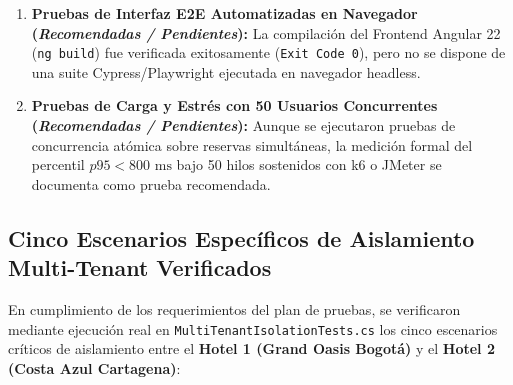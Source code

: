 \documentclass[12pt,a4paper]{article}
\begin{document}
\begin{enumerate}
    \item \textbf{Pruebas de Interfaz E2E Automatizadas en Navegador (\textit{Recomendadas / Pendientes}):} La compilaci\'on del Frontend Angular 22 (\texttt{ng build}) fue verificada exitosamente (\texttt{Exit Code 0}), pero no se dispone de una suite Cypress/Playwright ejecutada en navegador headless.
    \item \textbf{Pruebas de Carga y Estr\'es con 50 Usuarios Concurrentes (\textit{Recomendadas / Pendientes}):} Aunque se ejecutaron pruebas de concurrencia at\'omica sobre reservas simult\'aneas, la medici\'on formal del percentil $p95 < 800\text{ ms}$ bajo 50 hilos sostenidos con k6 o JMeter se documenta como prueba recomendada.
\end{enumerate}

\subsection{Cinco Escenarios Espec\'ificos de Aislamiento Multi-Tenant Verificados}
En cumplimiento de los requerimientos del plan de pruebas, se verificaron mediante ejecuci\'on real en \texttt{MultiTenantIsolationTests.cs} los cinco escenarios cr\'iticos de aislamiento entre el \textbf{Hotel 1 (Grand Oasis Bogot\'a)} y el \textbf{Hotel 2 (Costa Azul Cartagena)}:
\end{document}
